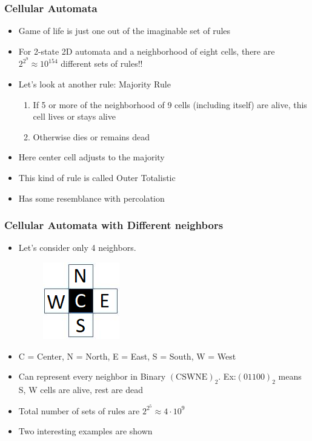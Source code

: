 \documentclass{beamer}
\begin{document}
\begin{frame}
    \frametitle{Cellular Automata} 
    \begin{itemize}
        \item Game of life is just one out of the imaginable set of rules 
        \item For 2-state 2D automata and a neighborhood of eight cells, there are $2^{2^9} \approx 10^{154}$ different sets of rules!!
        \item Let's look at another rule: Majority Rule
        \begin{enumerate}
            \item If 5 or more of the neighborhood of 9 cells (including itself) are alive, this cell lives or stays alive 
            \item Otherwise dies or remains dead
        \end{enumerate}
        \item Here center cell adjusts to the majority 
        \item This kind of rule is called Outer Totalistic
        \item Has some resemblance with percolation
    \end{itemize}
\end{frame}

\begin{frame}
    \frametitle{Cellular Automata with Different neighbors}
    \begin{itemize}
        \item Let's consider only 4 neighbors.
        \begin{figure}
            \centering
            \includegraphics[scale=0.5]{VonNeigh.png}
        \end{figure}
        \item C = Center, N = North, E = East, S = South, W = West
        \item Can represent every neighbor in Binary $(\text{CSWNE})_2$. Ex:$(01100)_2$ means S, W cells are alive, rest are dead
        \item Total number of sets of rules are $2^{2^5} \approx 4 \cdot 10^9$
        \item Two interesting examples are shown 
    \end{itemize}
\end{frame}
\end{document}
